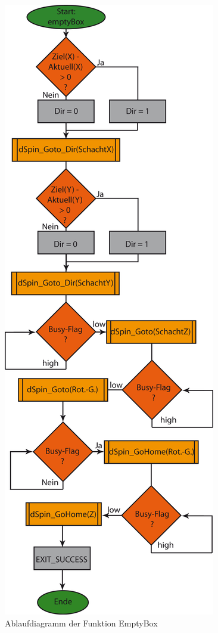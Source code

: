 \begin{figure}[h]
\includegraphics[scale = 0.8]{./EmptyBox.png}
\hspace{-14pt}
\caption{Ablaufdiagramm der Funktion EmptyBox}
\end{figure} 

